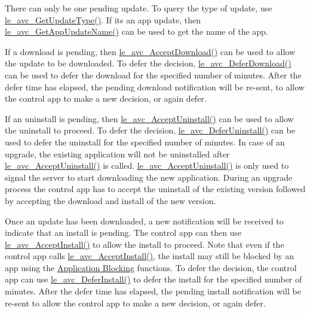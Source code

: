 There can only be one pending update. To query the type of update, use \hyperlink{le__avc__interface_8h_a1f085c5986e7c473ed70cff32320ce11}{le\+\_\+avc\+\_\+\+Get\+Update\+Type()}. If it\textquotesingle{}s an app update, then \hyperlink{le__avc__interface_8h_abf50df00e1df25c4eabfc6b3a004280a}{le\+\_\+avc\+\_\+\+Get\+App\+Update\+Name()} can be used to get the name of the app.

If a download is pending, then \hyperlink{le__avc__interface_8h_a3f7dea04dd1e9c456fe24a5eb98d2592}{le\+\_\+avc\+\_\+\+Accept\+Download()} can be used to allow the update to be downloaded. To defer the decision, \hyperlink{le__avc__interface_8h_a0c50c8ce89e21cbd9d0bfa431389b780}{le\+\_\+avc\+\_\+\+Defer\+Download()} can be used to defer the download for the specified number of minutes. After the defer time has elapsed, the pending download notification will be re-\/sent, to allow the control app to make a new decision, or again defer.

If an uninstall is pending, then \hyperlink{le__avc__interface_8h_aa5b34a29de899b0f333769cd86078e9e}{le\+\_\+avc\+\_\+\+Accept\+Uninstall()} can be used to allow the uninstall to proceed. To defer the decision, \hyperlink{le__avc__interface_8h_a4da465033b4438cdc75fdba894fd890f}{le\+\_\+avc\+\_\+\+Defer\+Uninstall()} can be used to defer the uninstall for the specified number of minutes. In case of an upgrade, the existing application will not be uninstalled after \hyperlink{le__avc__interface_8h_aa5b34a29de899b0f333769cd86078e9e}{le\+\_\+avc\+\_\+\+Accept\+Uninstall()} is called. \hyperlink{le__avc__interface_8h_aa5b34a29de899b0f333769cd86078e9e}{le\+\_\+avc\+\_\+\+Accept\+Uninstall()} is only used to signal the server to start downloading the new application. During an upgrade process the control app has to accept the uninstall of the existing version followed by accepting the download and install of the new version.

Once an update has been downloaded, a new notification will be received to indicate that an install is pending. The control app can then use \hyperlink{le__avc__interface_8h_ab3ff8076bb7b36ca58efc0ae240efedb}{le\+\_\+avc\+\_\+\+Accept\+Install()} to allow the install to proceed. Note that even if the control app calls \hyperlink{le__avc__interface_8h_ab3ff8076bb7b36ca58efc0ae240efedb}{le\+\_\+avc\+\_\+\+Accept\+Install()}, the install may still be blocked by an app using the \hyperlink{c_le_avc_c_le_avc_update_app}{Application Blocking} functions. To defer the decision, the control app can use \hyperlink{le__avc__interface_8h_a068f714a110bfa4cac179731a17798f3}{le\+\_\+avc\+\_\+\+Defer\+Install()} to defer the install for the specified number of minutes. After the defer time has elapsed, the pending install notification will be re-\/sent to allow the control app to make a new decision, or again defer.

